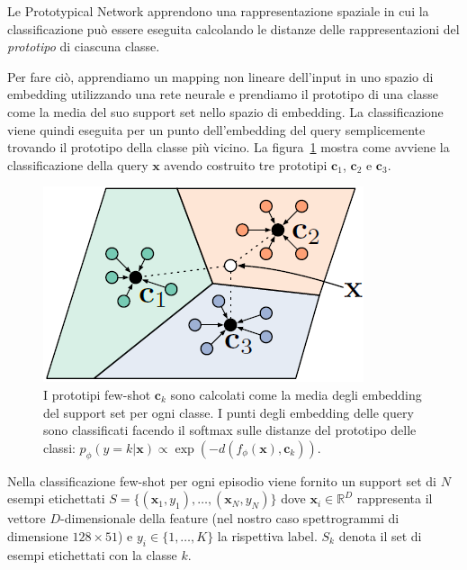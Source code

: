 \documentclass[12pt,a4paper,titlepage]{article}
\begin{document}
Le Prototypical Network apprendono una rappresentazione spaziale in cui la classificazione può essere eseguita calcolando le distanze delle rappresentazioni del \textit{prototipo} di ciascuna classe. 

Per fare ciò, apprendiamo un mapping non lineare dell'input in uno spazio di embedding utilizzando una rete neurale e prendiamo il prototipo di una classe come la media del suo support set nello spazio di embedding. La classificazione viene quindi eseguita per un punto dell'embedding del query semplicemente trovando il prototipo della classe più vicino. La figura~\ref{fig:proto_few_zero_shot} mostra come avviene la classificazione della query $\mathbf{x}$ avendo costruito tre prototipi $\mathbf{c}_1$, $\mathbf{c}_2$ e $\mathbf{c}_3$.

\begin{figure}[h]
	\centering
	\includegraphics[width=.5\textwidth]{Immagini/proto_few_shot}
	\caption{I prototipi few-shot $\mathbf{c}_k$ sono calcolati come la media degli embedding del support set per ogni classe. I punti degli embedding delle query sono classificati facendo il softmax sulle distanze del prototipo delle classi: $p_\phi(y = k|\mathbf{x}) \propto \exp \left(-d(f_\phi(\mathbf{x}),\mathbf{c}_k) \right)$.~\cite{snell:prototypical}}
	\label{fig:proto_few_zero_shot}
\end{figure}

Nella classificazione few-shot per ogni episodio viene fornito un support set di $N$ esempi etichettati  $S=\{(\mathbf{x}_1,y_1), \dots,(\mathbf{x}_N,y_N)\}$ dove $\mathbf{x}_i\in \mathbb{R}^D$ rappresenta il vettore $D$-dimensionale della feature (nel nostro caso spettrogrammi di dimensione $128 \times 51$) e $y_i \in \{1, \dots, K\}$ la rispettiva label. $S_k$ denota il set di esempi etichettati con la classe $k$.
\end{document}
